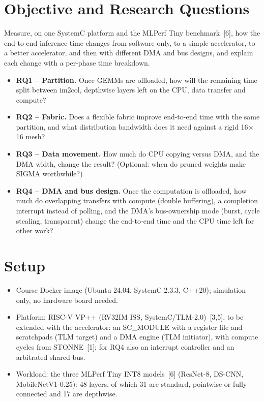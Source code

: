 \documentclass[10pt,a4paper]{article}
\begin{document}
\section{Objective and Research Questions}
Measure, on one SystemC platform and the MLPerf Tiny benchmark~[6], how the end-to-end inference time changes from software only, to a simple accelerator, to a better accelerator, and then with different DMA and bus designs, and explain each change with a per-phase time breakdown.
\begin{itemize}
\item \textbf{RQ1 -- Partition.} Once GEMMs are offloaded, how will the remaining time split between im2col, depthwise layers left on the CPU, data transfer and compute?
\item \textbf{RQ2 -- Fabric.} Does a flexible fabric improve end-to-end time with the same partition, and what distribution bandwidth does it need against a rigid 16$\times$16 mesh?
\item \textbf{RQ3 -- Data movement.} How much do CPU copying versus DMA, and the DMA width, change the result? (Optional: when do pruned weights make SIGMA worthwhile?)
\item \textbf{RQ4 -- DMA and bus design.} Once the computation is offloaded, how much do overlapping transfers with compute (double buffering), a completion interrupt instead of polling, and the DMA's bus-ownership mode (burst, cycle stealing, transparent) change the end-to-end time and the CPU time left for other work?
\end{itemize}

\section{Setup}
\begin{itemize}
\item Course Docker image (Ubuntu 24.04, SystemC 2.3.3, C++20); simulation only, no hardware board needed.
\item Platform: RISC-V VP++ (RV32IM ISS, SystemC/TLM-2.0)~[3,5], to be extended with the accelerator: an SC\_MODULE with a register file and scratchpads (TLM target) and a DMA engine (TLM initiator), with compute cycles from STONNE~[1]; for RQ4 also an interrupt controller and an arbitrated shared bus.
\item Workload: the three MLPerf Tiny INT8 models~[6] (ResNet-8, DS-CNN, MobileNetV1-0.25): 48 layers, of which 31 are standard, pointwise or fully connected and 17 are depthwise.
\end{itemize}
\end{document}
